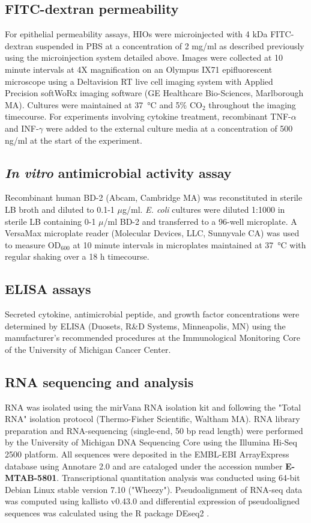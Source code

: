 \documentclass[9pt,lineo]{elife}
\begin{document}
\subsection*{{\bfseries\sffamily } FITC-dextran permeability}
\label{sec:orgheadline20}
For epithelial permeability assays, HIOs were microinjected with 4 kDa FITC-dextran suspended in PBS at a concentration of 2 mg/ml as described previously \citep{Leslie:2015} using the microinjection system detailed above. Images were collected at 10 minute intervals at 4X magnification on an Olympus IX71 epifluorescent microscope using a Deltavision RT live cell imaging system with Applied Precision softWoRx imaging software (GE Healthcare Bio-Sciences, Marlborough MA). Cultures were maintained at \SI{37}{\celsius} and 5\% CO\(_{\text{2}}\) throughout the imaging timecourse. For experiments involving cytokine treatment, recombinant TNF-\(\alpha\) and INF-\(\gamma\) were added to the external culture media at a concentration of 500 ng/ml at the start of the experiment.
\subsection*{{\bfseries\sffamily } \emph{In vitro} antimicrobial activity assay}
\label{sec:orgheadline21}
Recombinant human BD-2 (Abcam, Cambridge MA) was reconstituted in sterile LB broth and diluted to 0.1-1 \(\mu\)g/ml. \emph{E. coli} cultures were diluted 1:1000 in sterile LB containing 0-1 \(\mu\)/ml BD-2 and transferred to a 96-well microplate. A VersaMax microplate reader (Molecular Devices, LLC, Sunnyvale CA) was used to measure OD\(_{\text{600}}\) at 10 minute intervals in microplates maintained at \SI{37}{\celsius} with regular shaking  over a 18 h timecourse.
\subsection*{{\bfseries\sffamily } ELISA assays}
\label{sec:orgheadline22}
Secreted cytokine, antimicrobial peptide, and growth factor concentrations were determined by ELISA (Duosets, R\&D Systems, Minneapolis, MN) using the manufacturer's recommended procedures at the Immunological Monitoring Core of the University of Michigan Cancer Center.
\subsection*{{\bfseries\sffamily } RNA sequencing and analysis}
\label{sec:orgheadline23}
RNA was isolated using the mirVana RNA isolation kit and following the "Total RNA" isolation protocol (Thermo-Fisher Scientific, Waltham MA). RNA library preparation and RNA-sequencing (single-end, 50 bp read length) were performed by the University of Michigan DNA Sequencing Core using the Illumina Hi-Seq 2500 platform. All sequences were deposited in the EMBL-EBI ArrayExpress database using Annotare 2.0 and are cataloged under the accession number \textbf{E-MTAB-5801}. Transcriptional quantitation analysis was conducted using 64-bit Debian Linux stable version 7.10 ("Wheezy"). Pseudoalignment of RNA-seq data was computed using kallisto v0.43.0 \citep{Bray:2016} and differential expression of pseudoaligned sequences was calculated using the R package DEseq2 \citep{Love:2014}.
\end{document}
